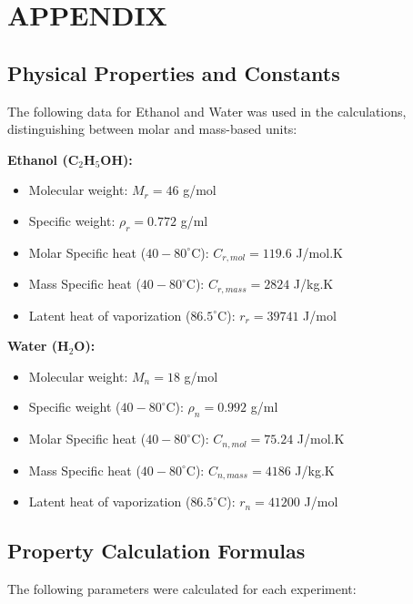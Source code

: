 \section{APPENDIX}

\subsection{Physical Properties and Constants}

The following data for Ethanol and Water was used in the calculations, distinguishing between molar and mass-based units:

\textbf{Ethanol (C$_2$H$_5$OH):}
\begin{itemize}
    \item Molecular weight: $M_r = 46$ g/mol
    \item Specific weight: $\rho_r = 0.772$ g/ml
    \item Molar Specific heat ($40 - 80^\circ$C): $C_{r, mol} = 119.6$ J/mol.K
    \item Mass Specific heat ($40 - 80^\circ$C): $C_{r, mass} = 2824$ J/kg.K
    \item Latent heat of vaporization ($86.5^\circ$C): $r_r = 39741$ J/mol
\end{itemize}

\textbf{Water (H$_2$O):}
\begin{itemize}
    \item Molecular weight: $M_n = 18$ g/mol
    \item Specific weight ($40 - 80^\circ$C): $\rho_n = 0.992$ g/ml
    \item Molar Specific heat ($40 - 80^\circ$C): $C_{n, mol} = 75.24$ J/mol.K
    \item Mass Specific heat ($40 - 80^\circ$C): $C_{n, mass} = 4186$ J/kg.K
    \item Latent heat of vaporization ($86.5^\circ$C): $r_n = 41200$ J/mol
\end{itemize}

\subsection{Property Calculation Formulas}

The following parameters were calculated for each experiment:


